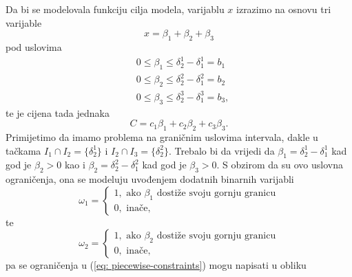 \documentclass[a4paper, utf8, 11pt, colorlinks]{article}
\begin{document}
Da bi se modelovala funkciju cilja modela, varijablu $x$ izrazimo na osnovu tri varijable 
$$x = \beta_1 + \beta_2 + \beta_3$$
pod uslovima 
\begin{align}
     &0   \leq \beta_1 \leq \delta^1_2 - \delta^1_1 = b_1 \nonumber \\
     &0  \leq \beta_2 \leq \delta^2_2 - \delta^2_1 = b_2 \nonumber \\
     &0  \leq \beta_3 \leq \delta^3_2- \delta^3_1 = b_3, \label{eq: piecewise-constraints}
\end{align}
te je cijena tada jednaka 
$$ C = c_1 \beta_1 + c_2 \beta_2 + c_3 \beta_3.$$ 
Primijetimo da imamo problema na graničnim uslovima intervala, dakle u tačkama $I_1 \cap I_2 =\{\delta^1_2\}$ i $I_2 \cap I_3 =\{\delta^2_2\}$. Trebalo bi da vrijedi da $\beta_1 =  \delta^1_2 - \delta^1_1$ kad god je $\beta_2  > 0$ kao i $\beta_2 =  \delta^2_2 - \delta^2_1$ kad god je $\beta_3  > 0$.  S obzirom da su ovo uslovna ograničenja, ona se modeluju uvođenjem dodatnih binarnih varijabli 
$$ \omega_1 = \begin{cases}
                   1, \mbox{ ako } \beta_1 \mbox{ dostiže svoju gornju granicu} \\
                   0, \mbox{ inače},
              \end{cases}$$
te 
$$ \omega_2 = \begin{cases}
                   1, \mbox{ ako } \beta_2 \mbox{ dostiže svoju gornju granicu} \\
                   0, \mbox{ inače}, 
              \end{cases}$$
pa se ograničenja u (\ref{eq: piecewise-constraints}) mogu napisati u obliku
\end{document}
